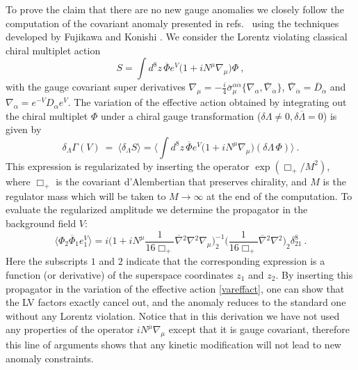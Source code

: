 \documentclass[12pt]{revtex4}
\begin{document}
To prove the claim that there are no new gauge anomalies we 
closely follow the computation of the covariant anomaly presented in 
refs.\ \cite{Hayashi:1998ca,Gates:2000gu} using the techniques developed by 
Fujikawa and Konishi \cite{Fujikawa:1983bg,Konishi:1985tu}. We consider the
Lorentz violating classical chiral multiplet action 
\begin{equation}
S = \int d^8z\, \overline{\Phi} 
e^V \Big(1 + i N^\mu \nabla_\mu  \Big) \Phi~, 
\end{equation}
with the gauge covariant super derivatives 
$\nabla_\mu = - \frac i4 \bar\sigma^{\alpha\dot\alpha}_\mu 
\{ \nabla_\alpha, \overline{\nabla}_{\dot\alpha} \}$, 
$\overline{\nabla}_{\dot\alpha} = \overline{D}_{\dot\alpha}$ and 
$ \nabla_\alpha = e^{-V}D_\alpha e^V$. The variation of the effective
action obtained by integrating out the chiral multiplet $\Phi$ under a
chiral gauge transformation 
($\delta \Lambda \neq 0, \delta \overline{\Lambda} = 0$)
is given by 
\begin{equation}
\delta_\Lambda\Gamma(V) ~=~ 
\langle \delta_\Lambda S \rangle = 
\Big\langle \int d^8z\,  \overline{\Phi} 
e^V \Big(1 + i N^\mu \nabla_\mu  \Big) (\delta \Lambda\, \Phi)
\Big\rangle~.
\label{vareffact}
\end{equation} 
This expression is regularizated by inserting the operator 
$\exp (\Box_+/M^2)$, where $\Box_+$ is the covariant d'Alembertian that
preserves chirality, and $M$ is the regulator mass which will be taken
to $M \rightarrow \infty$ at the end of the computation. To
evaluate the regularized amplitude we determine the propagator in the
background field $V$: 
\begin{equation}
\langle \Phi_2 \overline{\Phi}_1 e^V_1 \rangle = 
i \Big(   
1 + i N^\mu \frac 1{16 \Box_+} \overline{\nabla}{}^2 \nabla{}^2
\nabla_\mu
\Big)^{-1}_2 
\Big( 
\frac 1{16 \Box_+} \overline{\nabla}{}^2 \nabla{}^2
\Big)_2 \delta^8_{21}~.
\end{equation}
Here the subscripts $1$ and $2$ indicate that the corresponding
expression is a function (or derivative) of the superspace coordinates
$z_1$ and $z_2$. By inserting this propagator in the variation of the
effective action \eqref{vareffact}, one can show that the LV
factors exactly cancel out, and the anomaly reduces to the standard
one without any Lorentz violation. Notice that in this derivation we
have not used any properties of the operator $i N^\mu \nabla_\mu$
except that it is gauge covariant, therefore this line of arguments
shows that any kinetic modification will not lead to new anomaly
constraints. 
\end{document}
